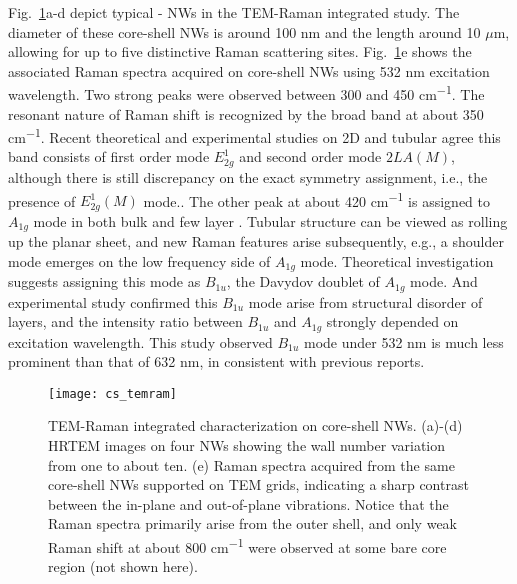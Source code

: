 Fig.~\ref{fig:ch5ws2ram}a-d depict typical - NWs in the TEM-Raman integrated study. The diameter of these core-shell NWs is around 100 nm and the length around 10 $\mu$m, allowing for up to five distinctive Raman scattering sites. Fig.~\ref{fig:ch5ws2ram}e shows the associated Raman spectra acquired on core-shell NWs using 532 nm excitation wavelength. Two strong peaks were observed between 300 and 450 \si{cm^{-1}}. The resonant nature\cite{Stacy1985} of Raman shift is recognized by the broad band at about 350 \si{cm^{-1}}.  Recent theoretical\cite{Molina-Sanchez2011} and experimental\cite{Staiger2012} studies on 2D and tubular  agree this band consists of first order mode $E_{2g}^1$ and second order mode $2LA(M)$, although there is still discrepancy on the exact symmetry assignment, i.e., the presence of $E_{2g}^1(M)$ mode.\cite{Berkdemir2013,Peimyoo2013}. The other peak at about 420 \si{cm^{-1}} is assigned to $A_{1g}$ mode in both bulk\cite{Sekine1980} and few layer . Tubular  structure can be viewed as rolling up the planar  sheet, and new Raman features arise subsequently, e.g., a shoulder mode emerges on the low frequency side of $A_{1g}$ mode. Theoretical investigation suggests assigning this mode as $B_{1u}$, the Davydov doublet of $A_{1g}$ mode.\cite{Ataca2012} And experimental study confirmed this $B_{1u}$ mode arise from structural disorder of  layers, and the intensity ratio between $B_{1u}$ and $A_{1g}$ strongly depended on excitation wavelength.\cite{Staiger2012} This study observed $B_{1u}$ mode under 532 nm is much less prominent than that of 632 nm, in consistent with previous reports.\cite{Krause2009,Krause2009a} 
\begin{figure}[htb]
\centering
\texttt{[image: cs\_temram]}
\caption[TEM-Raman integrated characterization on core-shell NWs]{TEM-Raman integrated characterization on core-shell NWs. (a)-(d) HRTEM images on four NWs showing the  wall number variation from one to about ten. (e) Raman spectra acquired from the same core-shell NWs supported on TEM grids, indicating a sharp contrast between the in-plane and out-of-plane vibrations. Notice that the Raman spectra primarily arise from the outer  shell, and only weak Raman shift at about 800 \si{cm^{-1}} were observed at some bare core region (not shown here).}
\label{fig:ch5ws2ram}
\end{figure}

